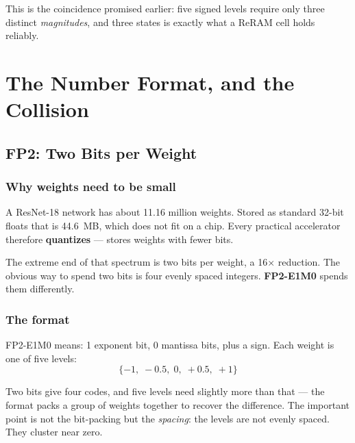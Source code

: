 \documentclass[11pt,a4paper]{report}
\newcommand{\jargon}[1]{\textcolor{acc}{\textbf{#1}}}
\begin{document}
This is the coincidence promised earlier: five signed levels require only
three distinct \emph{magnitudes}, and three states is exactly what a ReRAM
cell holds reliably.

\part{The Number Format, and the Collision}
\chapter{FP2: Two Bits per Weight}

\section{Why weights need to be small}

A ResNet-18 network has about 11.16 million weights. Stored as standard
32-bit floats that is 44.6~MB, which does not fit on a chip. Every practical
accelerator therefore \jargon{quantizes} --- stores weights with fewer bits.

The extreme end of that spectrum is two bits per weight, a 16$\times$
reduction. The obvious way to spend two bits is four evenly spaced integers.
\jargon{FP2-E1M0} spends them differently.

\section{The format}

FP2-E1M0 means: 1 exponent bit, 0 mantissa bits, plus a sign. Each weight is
one of five levels:
\[
\{-1,\; -0.5,\; 0,\; +0.5,\; +1\}
\]

Two bits give four codes, and five levels need slightly more than that --- the
format packs a group of weights together to recover the difference. The
important point is not the bit-packing but the \emph{spacing}: the levels are
not evenly spaced. They cluster near zero.
\end{document}
